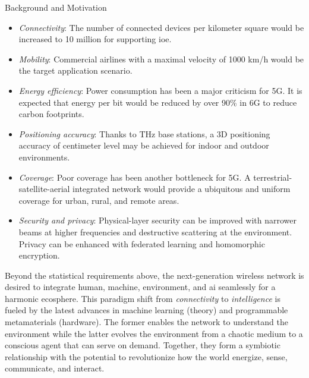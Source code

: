 \begin{section}{Background and Motivation}
\begin{itemize}
		\item \emph{Connectivity}: The number of connected devices per kilometer square would be increased to 10 million for supporting \gls{ioe}.
		\item \emph{Mobility}: Commercial airlines with a maximal velocity of 1000 km/h would be the target application scenario.
		\item \emph{Energy efficiency}: Power consumption has been a major criticism for 5G. It is expected that energy per bit would be reduced by over 90\% in 6G to reduce carbon footprints.
		\item \emph{Positioning accuracy}: Thanks to THz base stations, a 3D positioning accuracy of centimeter level may be achieved for indoor and outdoor environments.
		\item \emph{Coverage}: Poor coverage has been another bottleneck for 5G. A terrestrial-satellite-aerial integrated network would provide a ubiquitous and uniform coverage for urban, rural, and remote areas.
		\item \emph{Security and privacy}: Physical-layer security can be improved with narrower beams at higher frequencies and destructive scattering at the environment. Privacy can be enhanced with federated learning and homomorphic encryption.
	\end{itemize}

	Beyond the statistical requirements above, the next-generation wireless network is desired to integrate human, machine, environment, and \gls{ai} seamlessly for a harmonic ecosphere.
	This paradigm shift from \emph{connectivity} to \emph{intelligence} is fueled by the latest advances in machine learning (theory) and programmable metamaterials (hardware).
	The former enables the network to understand the environment while the latter evolves the environment from a chaotic medium to a conscious agent that can serve on demand.
	Together, they form a symbiotic relationship with the potential to revolutionize how the world energize, sense, communicate, and interact.


\end{section}

